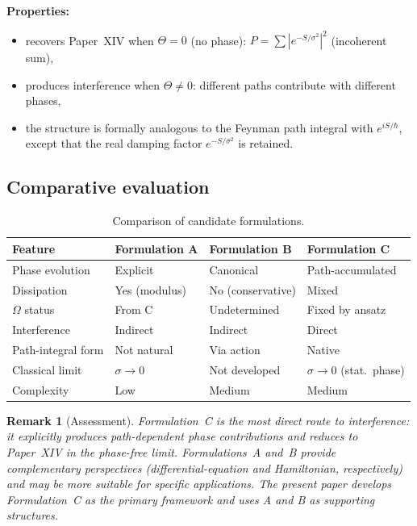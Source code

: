 \documentclass[12pt]{article}
\newtheorem{remark}[theorem]{Remark}
\begin{document}
\textbf{Properties:}
\begin{itemize}
    \item recovers Paper~XIV when $\Theta = 0$ (no phase): $P = \sum |e^{-S/\sigma^2}|^2$ (incoherent sum),
    \item produces interference when $\Theta \neq 0$: different paths contribute with different phases,
    \item the structure is formally analogous to the Feynman path integral with $e^{iS/\hbar}$, except that the real damping factor $e^{-S/\sigma^2}$ is retained.
\end{itemize}

\subsection{Comparative evaluation}

\begin{table}[ht]
\centering
\caption{Comparison of candidate formulations.}
\label{tab:comparison}
\begin{tabular}{@{}llll@{}}
\toprule
Feature & Formulation A & Formulation B & Formulation C \\
\midrule
Phase evolution & Explicit & Canonical & Path-accumulated \\
Dissipation & Yes (modulus) & No (conservative) & Mixed \\
$\Omega$ status & From C & Undetermined & Fixed by ansatz \\
Interference & Indirect & Indirect & Direct \\
Path-integral form & Not natural & Via action & Native \\
Classical limit & $\sigma \to 0$ & Not developed & $\sigma \to 0$ (stat.\ phase) \\
Complexity & Low & Medium & Medium \\
\bottomrule
\end{tabular}
\end{table}

\begin{remark}[Assessment]
Formulation~C is the most direct route to interference: it explicitly produces path-dependent phase contributions and reduces to Paper~XIV in the phase-free limit. Formulations~A and~B provide complementary perspectives (differential-equation and Hamiltonian, respectively) and may be more suitable for specific applications. The present paper develops Formulation~C as the primary framework and uses A and B as supporting structures.
\end{remark}
\end{document}
